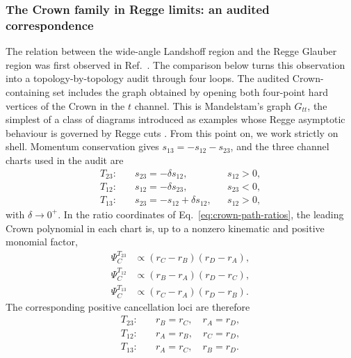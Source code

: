 \documentclass[a4paper,11pt]{article}
\begin{document}
\subsubsection{The Crown family in Regge limits: an audited correspondence}
\label{sec:crown-wide-angle-regge}

The relation between the wide-angle Landshoff region and the Regge Glauber
region was first observed in Ref.~\cite{Gardi:2024axt}.  The comparison below
turns this observation into a topology-by-topology audit through four loops.
The audited Crown-containing set includes the graph obtained by opening both
four-point hard vertices of the Crown in the \(t\) channel.  This is
Mandelstam's graph \(G_{tt}\), the simplest of a class of diagrams introduced
as examples whose Regge asymptotic behaviour is governed by Regge cuts
\cite{Mandelstam:1963cuts2}.
From this point on, we work strictly on shell.  Momentum conservation gives
\(s_{13}=-s_{12}-s_{23}\), and the three channel charts used in the audit are
\begin{align}
 T_{23}:&\quad s_{23}=-\delta s_{12}, &&s_{12}>0,\nonumber\\
 T_{12}:&\quad s_{12}=-\delta s_{23}, &&s_{23}<0,\nonumber\\
 T_{13}:&\quad s_{23}=-s_{12}+\delta s_{12}, &&s_{12}>0,
 \label{eq:crown-regge-charts}
\end{align}
with \(\delta\to0^+\).  In the ratio coordinates of
Eq.~\eqref{eq:crown-path-ratios}, the leading Crown polynomial in each chart
is, up to a nonzero kinematic and positive monomial factor,
\begin{align}
 \Psi_C^{T_{23}}&\propto(r_C-r_B)(r_D-r_A),\nonumber\\
 \Psi_C^{T_{12}}&\propto(r_B-r_A)(r_D-r_C),\nonumber\\
 \Psi_C^{T_{13}}&\propto(r_C-r_A)(r_D-r_B).
 \label{eq:crown-regge-ratio-factors}
\end{align}
The corresponding positive cancellation loci are therefore
\begin{align}
 T_{23}:&\quad r_B=r_C,\quad r_A=r_D,\nonumber\\
 T_{12}:&\quad r_A=r_B,\quad r_C=r_D,\nonumber\\
 T_{13}:&\quad r_A=r_C,\quad r_B=r_D.
 \label{eq:crown-regge-loci}
\end{align}
\end{document}
